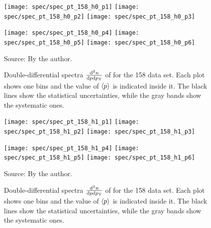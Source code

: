 \begin{figure}[!ht]
  \centering

  \texttt{[image: spec/spec\_pt\_158\_h0\_p1]}
  \texttt{[image: spec/spec\_pt\_158\_h0\_p2]}
  \texttt{[image: spec/spec\_pt\_158\_h0\_p3]}

  \texttt{[image: spec/spec\_pt\_158\_h0\_p4]}
  \texttt{[image: spec/spec\_pt\_158\_h0\_p5]}
  \texttt{[image: spec/spec\_pt\_158\_h0\_p6]}

  \caption{Double-differential spectra $\frac{\text{d}^2n}{\text{d}p\text{d}p_\text{T}}$
    of \lamb for the 158 \GeVc data set. Each plot shows one \pp bins and the value
    of $\langle p\rangle$ is indicated inside it. The black lines show the statistical
    uncertainties, while the gray bands show the systematic ones.}
  \label{fig:hadron:spec:vzero:all158:h0}
  \begin{center}
    \small Source: By the author. 
  \end{center}
\end{figure}


\begin{figure}[!ht]
  \centering

  \texttt{[image: spec/spec\_pt\_158\_h1\_p1]}
  \texttt{[image: spec/spec\_pt\_158\_h1\_p2]}
  \texttt{[image: spec/spec\_pt\_158\_h1\_p3]}

  \texttt{[image: spec/spec\_pt\_158\_h1\_p4]}
  \texttt{[image: spec/spec\_pt\_158\_h1\_p5]}
  \texttt{[image: spec/spec\_pt\_158\_h1\_p6]}

  \caption{Double-differential spectra $\frac{\text{d}^2n}{\text{d}p\text{d}p_\text{T}}$
    of \antilamb for the 158 \GeVc data set. Each plot shows one \pp bins and the value
    of $\langle p\rangle$ is indicated inside it. The black lines show the statistical
    uncertainties, while the gray bands show the systematic ones.}
  \label{fig:hadron:spec:vzero:all158:h1}
  \begin{center}
    \small Source: By the author. 
  \end{center}
\end{figure}


